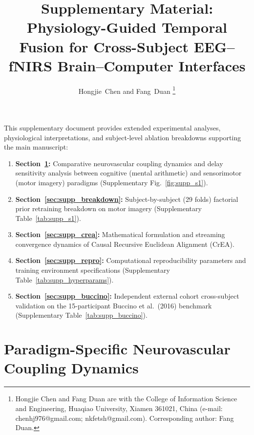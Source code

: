 \documentclass[journal]{IEEEtran}
\begin{document}
\title{Supplementary Material: Physiology-Guided Temporal Fusion for Cross-Subject EEG--fNIRS Brain--Computer Interfaces}

\author{Hongjie~Chen and Fang~Duan%
\thanks{Hongjie Chen and Fang Duan are with the College of Information Science and Engineering, Huaqiao University, Xiamen 361021, China (e-mail: chenhj976@gmail.com; nkfetsh@gmail.com). Corresponding author: Fang Duan.}%
}


\maketitle

This supplementary document provides extended experimental analyses, physiological interpretations, and subject-level ablation breakdowns supporting the main manuscript:
\begin{enumerate}
    \item \textbf{Section~\ref{sec:supp_dynamics}:} Comparative neurovascular coupling dynamics and delay sensitivity analysis between cognitive (mental arithmetic) and sensorimotor (motor imagery) paradigms (Supplementary Fig.~\ref{fig:supp_s1}).
    \item \textbf{Section~\ref{sec:supp_breakdown}:} Subject-by-subject (29 folds) factorial prior retraining breakdown on motor imagery (Supplementary Table~\ref{tab:supp_s1}).
    \item \textbf{Section~\ref{sec:supp_crea}:} Mathematical formulation and streaming convergence dynamics of Causal Recursive Euclidean Alignment (CrEA).
    \item \textbf{Section~\ref{sec:supp_repro}:} Computational reproducibility parameters and training environment specifications (Supplementary Table~\ref{tab:supp_hyperparams}).
    \item \textbf{Section~\ref{sec:supp_buccino}:} Independent external cohort cross-subject validation on the 15-participant Buccino et al.\ (2016) benchmark (Supplementary Table~\ref{tab:supp_buccino}).
\end{enumerate}

\section{Paradigm-Specific Neurovascular Coupling Dynamics}
\label{sec:supp_dynamics}
\end{document}
